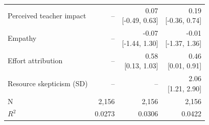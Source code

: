 \begin{tabular}{@{}p{4.5cm}rrr@{}}
Perceived teacher impact & -- & \shortstack{0.07\\{[-0.49, 0.63]}} & \shortstack{0.19\\{[-0.36, 0.74]}} \\\addlinespace[2pt]
Empathy & -- & \shortstack{-0.07\\{[-1.44, 1.30]}} & \shortstack{-0.01\\{[-1.37, 1.36]}} \\\addlinespace[2pt]
Effort attribution & -- & \shortstack{0.58\\{[0.13, 1.03]}} & \shortstack{0.46\\{[0.01, 0.91]}} \\\addlinespace[2pt]
Resource skepticism (SD) & -- & -- & \shortstack{2.06\\{[1.21, 2.90]}} \\\addlinespace[2pt]
N & 2,156 & 2,156 & 2,156 \\
$R^2$ & 0.0273 & 0.0306 & 0.0422 \\
\bottomrule
\end{tabular}
